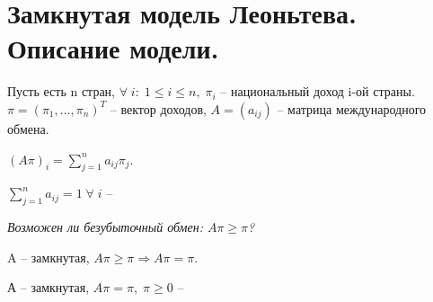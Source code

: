 \chapter{Замкнутая модель Леоньтева. Описание модели.}\label{cha:6}

Пусть есть n стран, $\forall \; i: \; 1 \leq i \leq n, \; \pi_i$ -- национальный доход i-ой страны. $\pi = (\pi_1, \ldots, \pi_n)^T$ -- вектор доходов, $A = (a_{ij})$ -- матрица международного обмена.
\begin{definition}
	$(A\pi)_i = \sum\limits_{j = 1}^na_{ij}\pi_j$.
\end{definition}

\begin{definition}
	$\sum\limits_{j = 1}^na_{ij} = 1 \; \forall \; i$ -- 
\end{definition}

\begin{question}
	\textit{Возможен ли безубыточный обмен: $A\pi \geq \pi$?}
\end{question}

\begin{clair}
	A -- замкнутая, $A\pi \geq \pi \Rightarrow A\pi = \pi.$
\end{clair}

\begin{definition}
	А -- замкнутая, $A\pi = \pi, \; \pi \geq 0$ -- 
\end{definition}
